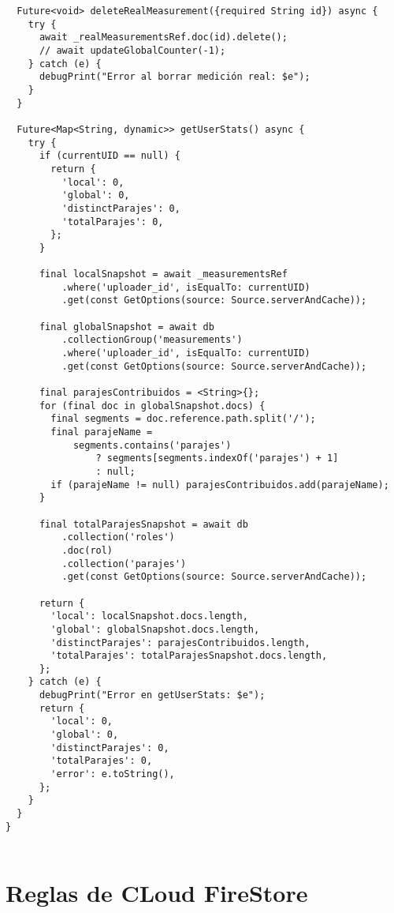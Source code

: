 \begin{verbatim}
  Future<void> deleteRealMeasurement({required String id}) async {
    try {
      await _realMeasurementsRef.doc(id).delete();
      // await updateGlobalCounter(-1);
    } catch (e) {
      debugPrint("Error al borrar medición real: $e");
    }
  }

  Future<Map<String, dynamic>> getUserStats() async {
    try {
      if (currentUID == null) {
        return {
          'local': 0,
          'global': 0,
          'distinctParajes': 0,
          'totalParajes': 0,
        };
      }

      final localSnapshot = await _measurementsRef
          .where('uploader_id', isEqualTo: currentUID)
          .get(const GetOptions(source: Source.serverAndCache));

      final globalSnapshot = await db
          .collectionGroup('measurements')
          .where('uploader_id', isEqualTo: currentUID)
          .get(const GetOptions(source: Source.serverAndCache));

      final parajesContribuidos = <String>{};
      for (final doc in globalSnapshot.docs) {
        final segments = doc.reference.path.split('/');
        final parajeName =
            segments.contains('parajes')
                ? segments[segments.indexOf('parajes') + 1]
                : null;
        if (parajeName != null) parajesContribuidos.add(parajeName);
      }

      final totalParajesSnapshot = await db
          .collection('roles')
          .doc(rol)
          .collection('parajes')
          .get(const GetOptions(source: Source.serverAndCache));

      return {
        'local': localSnapshot.docs.length,
        'global': globalSnapshot.docs.length,
        'distinctParajes': parajesContribuidos.length,
        'totalParajes': totalParajesSnapshot.docs.length,
      };
    } catch (e) {
      debugPrint("Error en getUserStats: $e");
      return {
        'local': 0,
        'global': 0,
        'distinctParajes': 0,
        'totalParajes': 0,
        'error': e.toString(),
      };
    }
  }
}


        \end{verbatim}


\newpage
\section{Reglas de CLoud FireStore}
\label{anexo:alg2}

